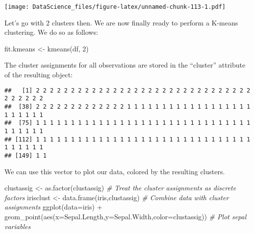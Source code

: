 \documentclass[
]{book}
\newenvironment{Shaded}{\begin{snugshade}}{\end{snugshade}}
\newcommand{\AttributeTok}[1]{\textcolor[rgb]{0.77,0.63,0.00}{#1}}
\newcommand{\CommentTok}[1]{\textcolor[rgb]{0.56,0.35,0.01}{\textit{#1}}}
\newcommand{\DecValTok}[1]{\textcolor[rgb]{0.00,0.00,0.81}{#1}}
\newcommand{\FunctionTok}[1]{\textcolor[rgb]{0.00,0.00,0.00}{#1}}
\newcommand{\NormalTok}[1]{#1}
\newcommand{\OtherTok}[1]{\textcolor[rgb]{0.56,0.35,0.01}{#1}}
\newcommand{\SpecialCharTok}[1]{\textcolor[rgb]{0.00,0.00,0.00}{#1}}
\begin{document}
\texttt{[image: DataScience\_files/figure-latex/unnamed-chunk-113-1.pdf]}

Let's go with 2 clusters then. We are now finally ready to perform a K-means clustering. We do so as follows:

\begin{Shaded}
\begin{Highlighting}[]
\NormalTok{fit.kmeans }\OtherTok{\textless{}{-}} \FunctionTok{kmeans}\NormalTok{(df, }\DecValTok{2}\NormalTok{)}
\end{Highlighting}
\end{Shaded}

The cluster assignments for all observations are stored in the ``cluster'' attribute of the resulting object:

\begin{Shaded}
\end{Shaded}

\begin{verbatim}
##   [1] 2 2 2 2 2 2 2 2 2 2 2 2 2 2 2 2 2 2 2 2 2 2 2 2 2 2 2 2 2 2 2 2 2 2 2 2 2
##  [38] 2 2 2 2 2 2 2 2 2 2 2 2 2 1 1 1 1 1 1 1 1 1 1 1 1 1 1 1 1 1 1 1 1 1 1 1 1
##  [75] 1 1 1 1 1 1 1 1 1 1 1 1 1 1 1 1 1 1 1 1 1 1 1 1 1 1 1 1 1 1 1 1 1 1 1 1 1
## [112] 1 1 1 1 1 1 1 1 1 1 1 1 1 1 1 1 1 1 1 1 1 1 1 1 1 1 1 1 1 1 1 1 1 1 1 1 1
## [149] 1 1
\end{verbatim}

We can use this vector to plot our data, colored by the resulting clusters.

\begin{Shaded}
\begin{Highlighting}[]
\NormalTok{clustassig }\OtherTok{\textless{}{-}} \FunctionTok{as.factor}\NormalTok{(clustassig) }\CommentTok{\# Treat the cluster assignments as discrete factors}
\NormalTok{irisclust }\OtherTok{\textless{}{-}} \FunctionTok{data.frame}\NormalTok{(iris,clustassig) }\CommentTok{\# Combine data with cluster assignments}
\FunctionTok{ggplot}\NormalTok{(}\AttributeTok{data=}\NormalTok{iris) }\SpecialCharTok{+} \FunctionTok{geom\_point}\NormalTok{(}\FunctionTok{aes}\NormalTok{(}\AttributeTok{x=}\NormalTok{Sepal.Length,}\AttributeTok{y=}\NormalTok{Sepal.Width,}\AttributeTok{color=}\NormalTok{clustassig)) }\CommentTok{\# Plot sepal variables}
\end{Highlighting}
\end{Shaded}
\end{document}
